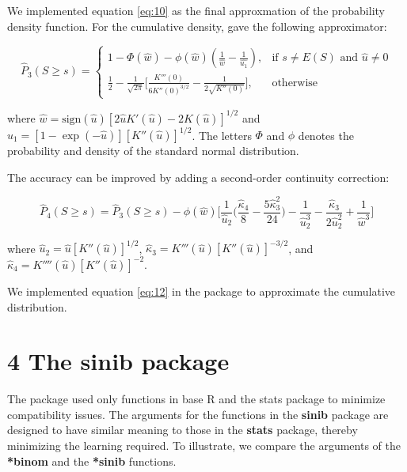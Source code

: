We implemented equation \ref{eq:10} as the final approxmation of the probability density function. For the cumulative density, \cite{Anonymous:0hq1uBaf} gave the following approximator: 

\begin{equation}
\hat{P}_3(S \geq s)=
\begin{cases}
1-\Phi(\hat{w})-\phi(\hat{w}) (\frac{1}{\hat{w}} - \frac{1}{\hat{u_1}}), & \text{if } s \neq E(S) \text{ and } \hat{u} \neq 0 \\
\frac{1}{2} - \frac{1}{\sqrt{2 \pi}} \big[\frac{K'''(0)}{6 K''(0)^{3/2}} - \frac{1}{2 \sqrt{K''(0)}} \big], & \text{otherwise}
\end{cases}
\end{equation}

where $\hat{w}= \text{sign}(\hat{u}) [2 \hat{u} K'(\hat{u}) - 2K(\hat{u})]^{1/2}$ and $\hat{u}_1=[1-\exp(-\hat{u})][K''(\hat{u})]^{1/2}$. The letters $\Phi$ and $\phi$ denotes the probability and density of the standard normal distribution. 

The accuracy can be improved by adding a second-order continuity correction:

\begin{equation}
\hat{P}_4(S \geq s)=\hat{P}_3(S \geq s) - \phi(\hat{w}) \Big [ \frac{1}{\hat{u}_2} \Big ( \frac{\hat{\kappa}_4}{8} - \frac{5 \hat{\kappa}^2_3}{24} \Big ) - \frac{1}{\hat{u}_2^3} - \frac{\hat{\kappa}_3}{2 \hat{u}_2^2} + \frac{1}{\hat{w}^3} \Big]
\label{eq:12}
\end{equation}

where $\hat{u}_2=\hat{u}[K''(\hat{u})]^{1/2}$, $\hat{\kappa}_3=K'''(\hat{u}) [K''(\hat{u})]^{-3/2}$, and $\hat{\kappa}_4 = K''''(\hat{u}) [K''(\hat{u})]^{-2}$.

We implemented equation \ref{eq:12} in the package to approximate the cumulative distribution. 

\section{4 The \textbf{sinib} package}

The package used only functions in base R and the stats package to minimize compatibility issues. The arguments for the functions in the \textbf{sinib} package are designed to have similar meaning to those in the \textbf{stats} package, thereby minimizing the learning required. To illustrate, we compare the arguments of the \textbf{*binom} and the \textbf{*sinib} functions. 

